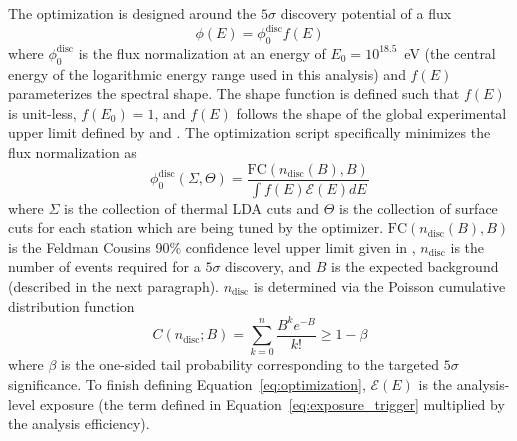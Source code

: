   The optimization is designed around the $5\sigma$ discovery potential of a flux 
  \begin{equation} 
    \phi(E) = \phi_0^{\text{disc}}f(E)
    \label{eq:optimizer_flux}
  \end{equation}  
  where $\phi_0^{\text{disc}}$ is the flux normalization at an energy of $E_0 = 10^{18.5}$~eV (the central energy of the logarithmic energy range used in this analysis) and $f(E)$ parameterizes the spectral shape. 
  The shape function is defined such that $f(E)$ is unit-less, $f(E_0)=1$, and $f(E)$ follows the shape of the global experimental upper limit defined by \citep{icecube_search-ehe} and \citep{anita_iv}. 
  The optimization script specifically minimizes the flux normalization as
  \begin{equation}
    \phi^{\text{disc}}_0 (\Sigma, \Theta) = \frac{\text{FC}(n_{\text{disc}}(B), B)}{\int f(E) \mathcal{E}(E) dE }
    \label{eq:optimization}
  \end{equation}
  where $\Sigma$ is the collection of thermal LDA cuts and $\Theta$ is the collection of surface cuts for each station which are being tuned by the optimizer.
  $\text{FC}(n_{\text{disc}}(B), B)$ is the Feldman Cousins 90\% confidence level upper limit given in \citep{feldman_cousins}, $n_{\text{disc}}$ is the number of events required for a $5\sigma$ discovery, and $B$ is the expected background (described in the next paragraph). 
  $n_{\text{disc}}$ is determined via the Poisson cumulative distribution function
  \begin{equation}
    C(n_{\text{disc}}; B) = \sum_{k=0}^n \frac{B^k e^{-B}}{k!} \geq 1 - \beta
    \label{eq:ndisc_B}
  \end{equation}
  where $\beta$ is the one-sided tail probability corresponding to the targeted $5\sigma$ significance.
  To finish defining Equation~\ref{eq:optimization},  $\mathcal{E}(E)$ is the analysis-level exposure (the term defined in Equation~\ref{eq:exposure_trigger} multiplied by the analysis efficiency).
  
